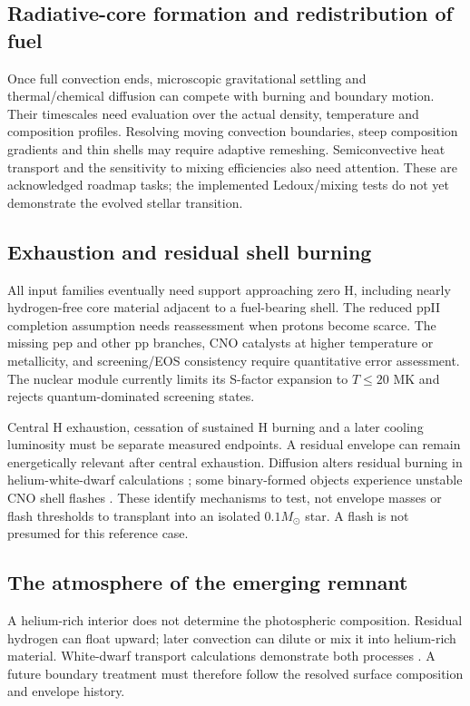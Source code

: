\documentclass[11pt,letterpaper]{article}
\newcommand{\Ms}{M_\odot}
\begin{document}
\subsection{Radiative-core formation and redistribution of fuel}
Once full convection ends, microscopic gravitational settling and thermal/chemical
diffusion can compete with burning and boundary motion. Their timescales need
evaluation over the actual density, temperature and composition profiles.
Resolving moving convection boundaries, steep composition gradients and thin
shells may require adaptive remeshing. Semiconvective heat transport and the
sensitivity to mixing efficiencies also need attention. These are acknowledged
roadmap tasks; the implemented Ledoux/mixing tests do not yet demonstrate the
evolved stellar transition.

\subsection{Exhaustion and residual shell burning}
All input families eventually need support approaching zero H, including
nearly hydrogen-free core material adjacent to a fuel-bearing shell. The reduced
ppII completion assumption needs reassessment when protons become scarce.
The missing pep and other pp branches, CNO catalysts at higher temperature or
metallicity, and screening/EOS consistency require quantitative error assessment.
The nuclear module currently limits its S-factor expansion to $T\leq20$ MK and
rejects quantum-dominated screening states.

Central H exhaustion, cessation of sustained H burning and a later cooling
luminosity must be separate measured endpoints. A residual envelope can remain
energetically relevant after central exhaustion. Diffusion alters residual
burning in helium-white-dwarf calculations \cite{althaus09}; some binary-formed
objects experience unstable CNO shell flashes \cite{istrate14}. These identify
mechanisms to test, not envelope masses or flash thresholds to transplant into
an isolated $0.1\Ms$ star. A flash is not presumed for this reference case.

\subsection{The atmosphere of the emerging remnant}
A helium-rich interior does not determine the photospheric composition.
Residual hydrogen can float upward; later convection can dilute or mix it into
helium-rich material. White-dwarf transport calculations demonstrate both
processes \cite{bedard23}. A future boundary treatment must therefore follow
the resolved surface composition and envelope history.
\end{document}
